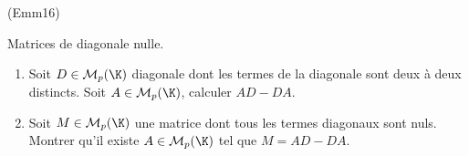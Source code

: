 \begin{tiny}(Emm16)\end{tiny} Matrices de diagonale nulle.
\begin{enumerate}
 \item Soit $D\in\mathcal{M}_p(\K)$ diagonale dont les termes de la diagonale sont deux à deux distincts. Soit $A\in\mathcal{M}_p(\K)$, calculer $AD - DA$.
 \item Soit $M\in\mathcal{M}_p(\K)$ une matrice dont tous les termes diagonaux sont nuls. Montrer qu'il existe $A\in\mathcal{M}_p(\K)$ tel que $M=AD - DA$.
\end{enumerate}
